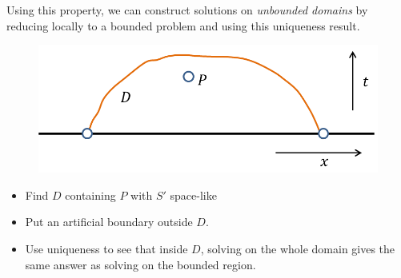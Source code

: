 \documentclass[12pt,a4paper]{report}
\begin{document}
Using this property, we can construct solutions on \emph{unbounded domains} by reducing locally to a bounded problem and using this uniqueness result.
\begin{figure}[h]
	\begin{center}
		\includegraphics[scale=0.6]{13}
	\end{center}
\end{figure}
\begin{itemize}
\item Find $D$ containing $P$ with $S'$ space-like 
\item Put an artificial boundary outside $D$.
\item Use uniqueness to see that inside $D$, solving on the whole domain gives the same answer as solving on the bounded region.
\end{itemize}
\end{document}
